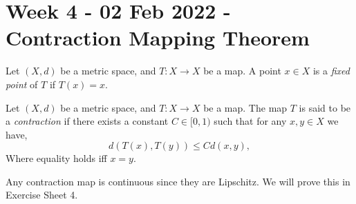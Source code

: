 \section{Week 4 - 02 Feb 2022 - Contraction Mapping Theorem}
\begin{definition}
  Let $(X,d)$ be a metric space, and $T:X\to X$ be a map. A point $x\in X$ is a
  \emph{fixed point} of $T$ if $T(x)=x$.
  \label{def:fixedPoint}
\end{definition}
\begin{definition}
  Let $(X,d)$ be a metric space, and $T:X\to X$ be a map. The map $T$ is said to
  be a \emph{contraction} if there exists a constant $C\in[0,1)$ such that for
  any $x,y\in X$ we have,
  \[d(T(x), T(y))\leq C d(x,y),\]
  Where equality holds iff $x=y$.
  \label{def:contractionMa}
\end{definition}
\begin{remark}
  Any contraction map is continuous since they are Lipschitz. We will prove this
  in Exercise Sheet 4.
\end{remark}

